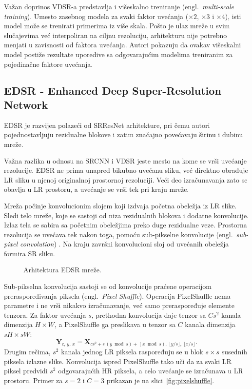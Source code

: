 \documentclass[12pt,a4paper]{article}
\begin{document}
Važan doprinos VDSR-a predstavlja i višeskalno treniranje (engl.\ \textit{multi-scale training}). Umesto zasebnog modela za svaki faktor uvećanja ($\times2$, $\times3$ i $\times4$), isti model može se trenirati primerima iz više skala. Pošto je ulaz mreže u svim slučajevima već interpoliran na ciljnu rezoluciju, arhitekturu nije potrebno menjati u zavisnosti od faktora uvećanja. Autori pokazuju da ovakav višeskalni model postiže rezultate uporedive sa odgovarajućim modelima treniranim za pojedinačne faktore uvećanja.

\subsection{EDSR - Enhanced Deep Super-Resolution Network}

EDSR \cite{EDSR} je razvijen polazeći od SRResNet \cite{SRGAN2017} arhitekture, pri čemu autori pojednostavljuju rezidualne blokove i zatim značajno povećavaju širinu i dubinu mreže.

Važna razlika u odnosu na SRCNN i VDSR jeste mesto na kome se vrši uvećanje rezolucije. EDSR ne prima unapred bikubno uvećanu sliku, već direktno obrađuje LR sliku u njenoj originalnoj prostornoj rezoluciji. Veći deo izračunavanja zato se obavlja u LR prostoru, a uvećanje se vrši tek pri kraju mreže.

Mreža počinje konvolucionim slojem koji izdvaja početna obeležja iz LR slike. Sledi telo mreže, koje se sastoji od niza rezidualnih blokova \cite{ResNet} i dodatne konvolucije. Izlaz tela se sabira sa početnim obeležjima preko duge rezidualne veze. Prostorna rezolucija se uvećava tek nakon toga, pomoću sub-pikselne konvolucije (engl.\ \textit{sub-pixel convolution}) \cite{ESPCN}. Na kraju završni konvolucioni sloj od uvećanih obeležja formira SR sliku.

\begin{figure}[H]
	\centering
	\resizebox{\textwidth}{!}{}
	\caption{Arhitektura EDSR mreže.}
	\label{fig:edsr}
\end{figure}

Sub-pikselna konvolucija sastoji se od konvolucije praćene operacijom preraspoređivanja piksela (engl.\ \textit{Pixel Shuffle}). Operacija PixelShuffle nema parametre i ne vrši nikakvo izračunavanje, već samo preraspoređuje elemente tenzora. Za faktor uvećanja $s$, prethodna konvolucija daje tenzor sa $C s^2$ kanala dimenzija $H\times W$, a PixelShuffle ga preslikava u tenzor sa $C$ kanala dimenzija $sH\times sW$:
\begin{equation}
	\mathbf{Y}_{c,\, y,\, x}
	=
	\mathbf{X}_{c s^2 + s\,(y \bmod s) + (x \bmod s),\; \lfloor y/s \rfloor,\; \lfloor x/s \rfloor}.
\end{equation}
Drugim rečima, $s^2$ kanala jednog LR piksela raspoređuju se u blok $s\times s$ susednih piksela izlazne slike. Konvolucija ispred PixelShuffle tako uči da za svaki LR piksel predvidi $s^2$ odgovarajućih HR piksela, a celo uvećanje se izračunava u LR prostoru. Primer za $s=2$ i $C=3$ prikazan je na slici~\ref{fig:pixelshuffle}.
\end{document}
